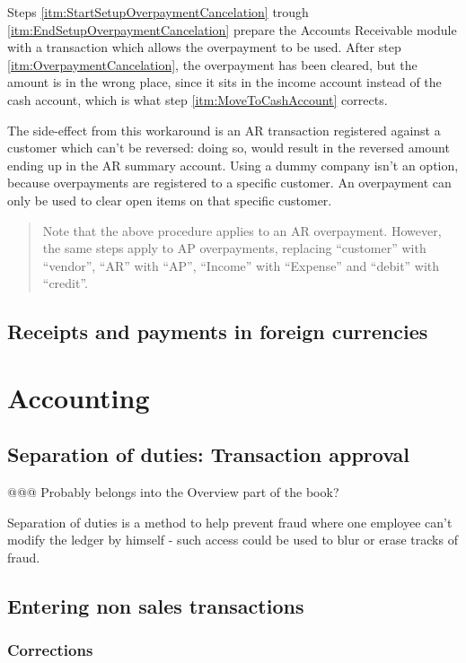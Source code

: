 Steps \ref{itm:StartSetupOverpaymentCancelation} trough \ref{itm:EndSetupOverpaymentCancelation}
prepare the Accounts Receivable module with a transaction which allows the overpayment to be used.
After step \ref{itm:OverpaymentCancelation}, the overpayment has been cleared, but the
amount is in the wrong place, since it sits in the income account instead of the cash account,
which is what step \ref{itm:MoveToCashAccount} corrects.

The side-effect from this workaround is an AR transaction registered against a customer which can't
be reversed: doing so, would result in the reversed amount ending up in the AR summary account.  Using
a dummy company isn't an option, because overpayments are registered to a specific customer.  An
overpayment can only be used to clear open items on that specific customer.

\begin{quotation}
Note that the above procedure applies to an AR overpayment. However, the same steps apply to
AP overpayments, replacing ``customer'' with ``vendor'', ``AR'' with ``AP'', ``Income'' with
``Expense'' and ``debit'' with ``credit''.
\end{quotation}

\section{Receipts and payments in foreign currencies}

\chapter{Accounting}

\section{Separation of duties: Transaction approval}
\label{sec:SeparationOfDuties}
@@@ Probably belongs into the Overview part of the book?

Separation of duties is a method to help prevent fraud where one employee can't modify the
ledger by himself - such access could be used to blur or erase tracks of fraud.

\section{Entering non sales transactions}

\subsection{Corrections}
